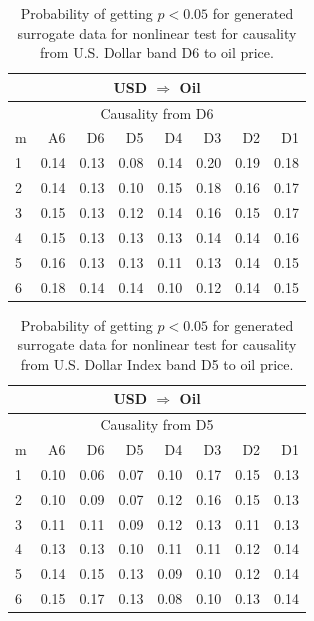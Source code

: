 %
%
\begin{table}[H]
\begin{center}
\begin{tabular}{l|r r r r r r r}
\hline\hline
\multicolumn{8}{c}{USD $\Rightarrow$ Oil}\\
\hline
\multicolumn{8}{c}{Causality from D6}\\
\hline\hline
m & A6 & D6 & D5 & D4 & D3 & D2 & D1 \\
\hline
1 & 0.14 & 0.13 & 0.08 & 0.14 & 0.20 & 0.19 & 0.18 \\
2 & 0.14 & 0.13 & 0.10 & 0.15 & 0.18 & 0.16 & 0.17 \\
3 & 0.15 & 0.13 & 0.12 & 0.14 & 0.16 & 0.15 & 0.17 \\
4 & 0.15 & 0.13 & 0.13 & 0.13 & 0.14 & 0.14 & 0.16 \\
5 & 0.16 & 0.13 & 0.13 & 0.11 & 0.13 & 0.14 & 0.15 \\
6 & 0.18 & 0.14 & 0.14 & 0.10 & 0.12 & 0.14 & 0.15 \\
\hline\hline
\end{tabular}
\caption{Probability of getting $p < 0.05$ for generated surrogate data for nonlinear test for causality from U.S. Dollar band D6 to oil price.}
\end{center}
\end{table}

%
%
\begin{table}[H]
\begin{center}
\begin{tabular}{l|r r r r r r r}
\hline\hline
\multicolumn{8}{c}{USD $\Rightarrow$ Oil}\\
\hline
\multicolumn{8}{c}{Causality from D5}\\
\hline\hline
m & A6 & D6 & D5 & D4 & D3 & D2 & D1 \\
\hline
1 & 0.10 & 0.06 & \cellcolor{mygreen}0.07 & 0.10 & 0.17 & \cellcolor{mygrey}0.15 & 0.13 \\
2 & 0.10 & 0.09 & \cellcolor{mygreen}0.07 & 0.12 & 0.16 & 0.15 & 0.13 \\
3 & 0.11 & 0.11 & 0.09 & 0.12 & 0.13 & 0.11 & 0.13 \\
4 & 0.13 & \cellcolor{mygrey}0.13 & 0.10 & 0.11 & 0.11 & 0.12 & 0.14 \\
5 & 0.14 & \cellcolor{mygrey}0.15 & 0.13 & \cellcolor{mygreen}0.09 & 0.10 & 0.12 & 0.14 \\
6 & 0.15 & \cellcolor{mygrey}0.17 & \cellcolor{mygrey}0.13 & \cellcolor{mygreen}0.08 & 0.10 & 0.13 & 0.14 \\
\hline\hline
\end{tabular}
\caption{Probability of getting $p < 0.05$ for generated surrogate data for nonlinear test for causality from U.S. Dollar Index band D5 to oil price.}
\end{center}
\end{table}

